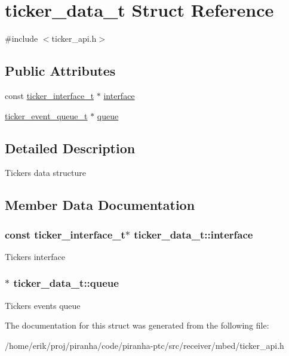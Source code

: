 \hypertarget{structticker__data__t}{}\section{ticker\+\_\+data\+\_\+t Struct Reference}
\label{structticker__data__t}


{\ttfamily \#include $<$ticker\+\_\+api.\+h$>$}

\subsection*{Public Attributes}
\begin{DoxyCompactItemize}
\item 
const \hyperlink{structticker__interface__t}{ticker\+\_\+interface\+\_\+t} $\ast$ \hyperlink{structticker__data__t_a0718095e14627caae5e4654fb8c0f300}{interface}
\item 
\hyperlink{structticker__event__queue__t}{ticker\+\_\+event\+\_\+queue\+\_\+t} $\ast$ \hyperlink{structticker__data__t_af531ed914f4a6dd105cf4e801d4d26b2}{queue}
\end{DoxyCompactItemize}


\subsection{Detailed Description}
Tickers data structure 

\subsection{Member Data Documentation}
\subsubsection[{\texorpdfstring{interface}{interface}}]{\setlength{\rightskip}{0pt plus 5cm}const {\bf ticker\+\_\+interface\+\_\+t}$\ast$ ticker\+\_\+data\+\_\+t\+::interface}\hypertarget{structticker__data__t_a0718095e14627caae5e4654fb8c0f300}{}\label{structticker__data__t_a0718095e14627caae5e4654fb8c0f300}
Ticker\textquotesingle{}s interface 
\subsubsection[{\texorpdfstring{queue}{queue}}]{$\ast$ ticker\+\_\+data\+\_\+t\+::queue}\hypertarget{structticker__data__t_af531ed914f4a6dd105cf4e801d4d26b2}{}\label{structticker__data__t_af531ed914f4a6dd105cf4e801d4d26b2}
Ticker\textquotesingle{}s events queue 

The documentation for this struct was generated from the following file\+:\begin{DoxyCompactItemize}
\item 
/home/erik/proj/piranha/code/piranha-\/ptc/src/receiver/mbed/ticker\+\_\+api.\+h\end{DoxyCompactItemize}
